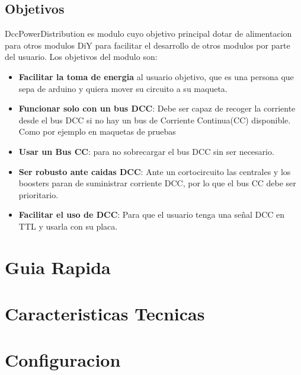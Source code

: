 \documentclass{DccDiyTools}
\begin{document}
\subsection{Objetivos}
DccPowerDistribution es modulo cuyo objetivo principal dotar de alimentacion para otros modulos DiY
para facilitar el desarrollo de otros modulos por parte del usuario. Los objetivos del modulo son:
\begin{itemize}
    \item \textbf{Facilitar la toma de energia} al usuario objetivo, que es una persona que sepa
de arduino y quiera mover su circuito a su maqueta.   
    \item \textbf{Funcionar solo con un bus DCC}: Debe ser capaz de recoger la corriente desde el bus
DCC si no hay un bus de Corriente Continua(CC) disponible. Como por ejemplo en maquetas de pruebas
    \item \textbf{Usar un Bus CC}: para no sobrecargar el bus DCC sin ser necesario.
    \item \textbf{Ser robusto ante caidas DCC}: Ante un cortocircuito las centrales y los boosters 
paran de suministrar corriente DCC, por lo que el bus CC debe ser prioritario.
    \item \textbf{Facilitar el uso de DCC}: Para que el usuario tenga una señal DCC en TTL y usarla
con su placa.
\end{itemize}

\newpage
\section{Guia Rapida}


\newpage
\section{Caracteristicas Tecnicas}


\newpage
\section{Configuracion}

\end{document}
